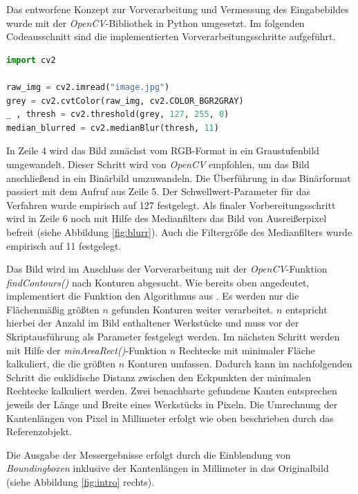 \documentclass[twocolumn,10pt]{asme2ej}
\begin{document}
Das entworfene Konzept zur Vorverarbeitung und Vermessung des Eingabebildes wurde mit der \emph{OpenCV}-Bibliothek in Python umgesetzt. Im folgenden Codeausschnitt sind die implementierten Vorverarbeitungsschritte aufgeführt.

\begin{lstlisting}[language=Python, caption=Vorverarbeitung]
import cv2

raw_img = cv2.imread("image.jpg")
grey = cv2.cvtColor(raw_img, cv2.COLOR_BGR2GRAY)
_ , thresh = cv2.threshold(grey, 127, 255, 0)
median_blurred = cv2.medianBlur(thresh, 11)

\end{lstlisting}
In Zeile 4 wird das Bild zunächst vom RGB-Format in ein Graustufenbild umgewandelt. Dieser Schritt wird von  \emph{OpenCV} empfohlen, um das Bild anschließend in ein Binärbild umzuwandeln. Die Überführung in das Binärformat passiert mit dem Aufruf aus Zeile 5. Der Schwellwert-Parameter für das Verfahren wurde empirisch auf 127 festgelegt. Als finaler Vorbereitungsschritt wird in Zeile 6 noch mit Hilfe des Medianfilters das Bild von Ausreißerpixel befreit (siehe Abbildung \ref{fig:blurr}). Auch die Filtergröße des Medianfilters wurde empirisch auf 11 festgelegt.

Das Bild wird im Anschluss der Vorverarbeitung mit der \emph{OpenCV}-Funktion \emph{findContours()} nach Konturen abgesucht. Wie bereits oben angedeutet, implementiert die Funktion den Algorithmus aus \cite{Suzuki1985TopologicalSA}. Es werden nur die Flächenmäßig größten \(n\) gefunden Konturen weiter verarbeitet. \(n\) entspricht hierbei der Anzahl im  Bild enthaltener Werkstücke und muss vor der Skriptausführung als Parameter festgelegt werden. Im nächsten Schritt werden mit Hilfe der \emph{minAreaRect()}-Funktion \(n\) Rechtecke mit minimaler Fläche kalkuliert, die die größten \(n\) Konturen umfassen. Dadurch kann im nachfolgenden Schritt die euklidische Distanz zwischen den Eckpunkten der minimalen Rechtecke kalkuliert werden. Zwei benachbarte gefundene Kanten entsprechen jeweils der Länge und Breite eines Werkstücks in Pixeln. Die Umrechnung der Kantenlängen von Pixel in Millimeter erfolgt wie oben beschrieben durch das Referenzobjekt.

Die Ausgabe der Messergebnisse erfolgt durch die Einblendung von \emph{Boundingboxen} inklusive der Kantenlängen in Millimeter in das Originalbild (siehe Abbildung \ref{fig:intro} rechts).
\end{document}

